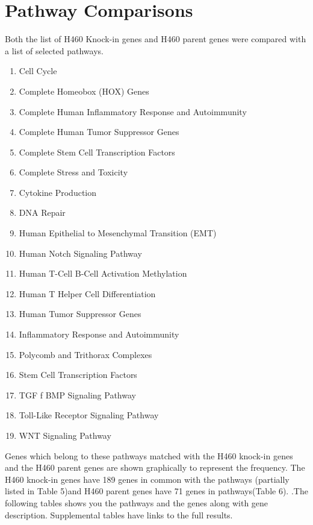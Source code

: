 \documentclass[11pt]{article}
\begin{document}
\newpage


\section*{Pathway Comparisons}

Both the list of H460 Knock-in genes and H460 parent genes were compared with a list of selected pathways.

\begin{enumerate}[itemsep=-0.2mm]
\item Cell Cycle                                 
\item Complete Homeobox (HOX) Genes                      
\item Complete Human Inflammatory Response and Autoimmunity 
\item Complete Human Tumor Suppressor Genes              
\item Complete Stem Cell Transcription Factors            
\item Complete Stress and Toxicity                         
\item Cytokine Production                                
\item DNA Repair 
\item Human Epithelial to Mesenchymal Transition (EMT)    
\item Human Notch Signaling Pathway                      
\item Human T-Cell B-Cell Activation Methylation         
\item Human T Helper Cell Differentiation                
\item Human Tumor Suppressor Genes                        
\item Inflammatory Response and Autoimmunity               
\item Polycomb and Trithorax Complexes                     
\item Stem Cell Transcription Factors                    
\item TGF f BMP Signaling Pathway                          
\item Toll-Like Receptor Signaling Pathway               
\item WNT Signaling Pathway                              
\end{enumerate}

Genes which belong to these pathways matched with the H460 knock-in genes and the H460 parent genes are shown graphically to represent the frequency. The H460 knock-in genes have 189 genes in common with the pathways (partially listed in Table 5)and H460 parent genes have  71 genes in pathways(Table 6). 
.The following tables shows you the pathways and the genes along with gene description. Supplemental tables have links to the full results.
\end{document}
